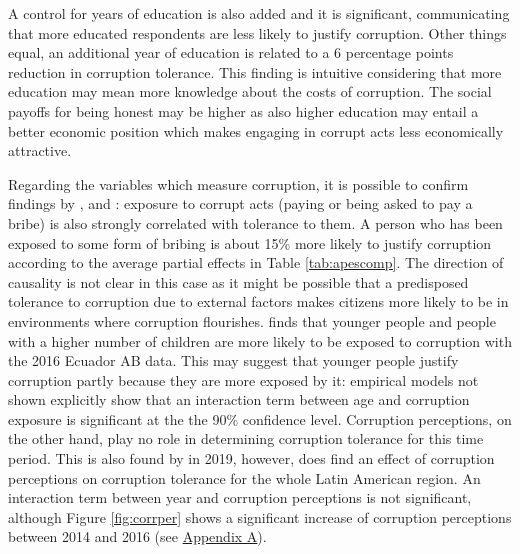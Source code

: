 \documentclass[12pt,a4]{article}\usepackage[]{graphicx}\usepackage[]{xcolor}
\begin{document}
A control for years of education is also added and it is significant, communicating that more educated respondents are less likely to justify corruption. Other things equal, an additional year of education is related to a 6 percentage points reduction in corruption tolerance. This finding is intuitive considering that more education may mean more knowledge about the costs of corruption. The social payoffs for being honest may be higher as also higher education may entail a better economic position which makes engaging in corrupt acts less economically attractive. 

Regarding the variables which measure corruption, it is possible to confirm findings by \textcite{Moscoso.2020}, \textcite{Lupu.2017} and \textcite{Singer.2016}: exposure to corrupt acts (paying or being asked to pay a bribe) is also strongly correlated with tolerance to them. A person who has been exposed to some form of bribing is about 15\% more likely to justify corruption according to the average partial effects in Table \ref{tab:apescomp}. The direction of causality is not clear in this case as it might be possible that a predisposed tolerance to corruption due to external factors makes citizens more likely to be in environments where corruption flourishes. \textcite{Moscoso.2018} finds that younger people and people with a higher number of children are more likely to be exposed to corruption with the 2016 Ecuador AB data. This may suggest that younger people justify corruption partly because they are more exposed by it: empirical models not shown explicitly show that an interaction term between age and corruption exposure is significant at the the 90\% confidence level. Corruption perceptions, on the other hand, play no role in determining corruption tolerance for this time period. This is also found by \textcite{Moscoso.2020} in 2019, however, \textcite{Lupu.2017} does find an effect of corruption perceptions on corruption tolerance for the whole Latin American region. An interaction term between year and corruption perceptions is not significant, although Figure \ref{fig:corrper} shows a significant increase of corruption perceptions between 2014 and 2016 (see \hyperref[app:first]{Appendix A}). 
\end{document}
